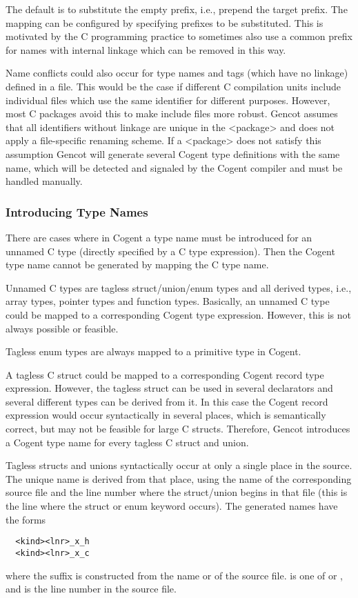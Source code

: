 The default
is to substitute the empty prefix, i.e., prepend the target prefix. The mapping can be configured by specifying prefixes
to be substituted. This is motivated by the C programming practice to sometimes also use a common prefix for names 
with internal linkage which can be removed in this way.

Name conflicts could also occur for type names and tags (which have no linkage) defined in a  file. 
This would be the case if different
C compilation units include individual  files which use the same identifier for different purposes. However, most
C packages avoid this to make include files more robust. Gencot assumes that all identifiers without linkage 
are unique in the <package> and does not apply a file-specific renaming scheme. If a <package> does not satisfy this assumption
Gencot will generate several Cogent type definitions with the same name, which will be detected and signaled by the Cogent 
compiler and must be handled manually.

\subsubsection{Introducing Type Names}

There are cases where in Cogent a type name must be introduced for an unnamed C type (directly specified by a C type 
expression). Then the Cogent type name cannot be generated by mapping the C type name.

Unnamed C types are tagless struct/union/enum types and all derived types, i.e., array types, pointer types and 
function types. Basically, an unnamed C type could be mapped to a corresponding Cogent type expression. However,
this is not always possible or feasible.

Tagless enum types are always mapped to a primitive type in Cogent.

A tagless C struct could be mapped to a corresponding Cogent record type expression. However, the tagless struct
can be used in several declarators and several different types can be derived from it. In this case the Cogent record
expression would occur syntactically in several places, which is semantically correct, but may not be feasible for
large C structs. Therefore, Gencot introduces a Cogent type name for every tagless C struct and union.

Tagless structs and unions syntactically occur at only a single place in the source. The unique name is derived from 
that place, using the name of the corresponding source file and the line number where the struct/union begins
in that file (this is the line where the struct or enum keyword occurs).
The generated names have the forms
\begin{verbatim}
  <kind><lnr>_x_h
  <kind><lnr>_x_c
\end{verbatim}
where the suffix is constructed from the name  or  of the source file.  is one of
 or , and  is the line number in the source file.

